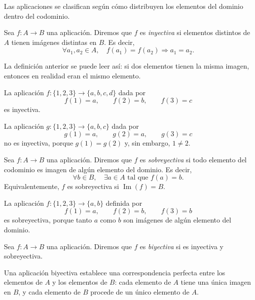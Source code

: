 Las aplicaciones se clasifican según cómo distribuyen los elementos del dominio dentro del codominio.

\begin{definicion}
Sea \(f:A\to B\) una aplicación. Diremos que \(f\) es \emph{inyectiva} si elementos distintos de \(A\) tienen imágenes distintas en \(B\). Es decir,
\[
\forall a_1,a_2\in A,\quad f(a_1)=f(a_2)\Rightarrow a_1=a_2.
\]
\end{definicion}

La definición anterior se puede leer así: si dos elementos tienen la misma imagen, entonces en realidad eran el mismo elemento.

\begin{ejemplo}
La aplicación \(f:\{1,2,3\}\to \{a,b,c,d\}\) dada por
\[
f(1)=a,\qquad f(2)=b,\qquad f(3)=c
\]
es inyectiva.
\end{ejemplo}

\begin{contraejemplo}
La aplicación \(g:\{1,2,3\}\to \{a,b,c\}\) dada por
\[
g(1)=a,\qquad g(2)=a,\qquad g(3)=c
\]
no es inyectiva, porque \(g(1)=g(2)\) y, sin embargo, \(1\ne 2\).
\end{contraejemplo}

\begin{definicion}
Sea \(f:A\to B\) una aplicación. Diremos que \(f\) es \emph{sobreyectiva} si todo elemento del codominio es imagen de algún elemento del dominio. Es decir,
\[
\forall b\in B,\quad \exists a\in A\text{ tal que }f(a)=b.
\]
Equivalentemente, \(f\) es sobreyectiva si \(\operatorname{Im}(f)=B\).
\end{definicion}

\begin{ejemplo}
La aplicación \(f:\{1,2,3\}\to \{a,b\}\) definida por
\[
f(1)=a,\qquad f(2)=b,\qquad f(3)=b
\]
es sobreyectiva, porque tanto \(a\) como \(b\) son imágenes de algún elemento del dominio.
\end{ejemplo}

\begin{definicion}
Sea \(f:A\to B\) una aplicación. Diremos que \(f\) es \emph{biyectiva} si es inyectiva y sobreyectiva.
\end{definicion}

Una aplicación biyectiva establece una correspondencia perfecta entre los elementos de \(A\) y los elementos de \(B\): cada elemento de \(A\) tiene una única imagen en \(B\), y cada elemento de \(B\) procede de un único elemento de \(A\).


